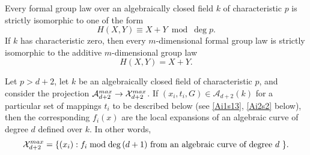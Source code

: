 \documentclass[10pt,a4paper]{amsart}
\begin{document}
\begin{lem}
\label{FGNF1}
 Every formal group law over an algebraically closed field $k$ of characteristic $p$ is strictly isomorphic to one of the form
$$H(X,Y) \equiv X + Y \bmod \deg p.$$
If $k$ has characteristic zero, then every $m$-dimensional formal group law is strictly isomorphic to the additive $m$-dimensional 
group law
$$H(X,Y) = X + Y.$$
\end{lem}

\begin{thm}
Let $p > d + 2$, let $k$ be an algebraically closed field of characteristic $p$, 
and consider the projection $\mathcal{A}_{d+2}^{\rm max} \to \mathcal{X}_{d+2}^{\rm max}$.  If $(x_i, t_i, G) \in \mathcal{A}_{d+2}(k)$
for a particular set of mappings $t_i$ to be described below (see \eqref{Ai1s13}, \eqref{Ai2s2} below), then
the corresponding $f_i(x)$ are the local expansions of an algebraic curve of degree $d$ defined over $k$.  In other words, 
$$\mathcal{X}_{d+2}^{\rm max} =
 \{(x_i) : f_i \bmod \deg\, (d+1) \text{ from an algebraic curve of degree $d$ }\}.$$
\end{thm}
\end{document}
